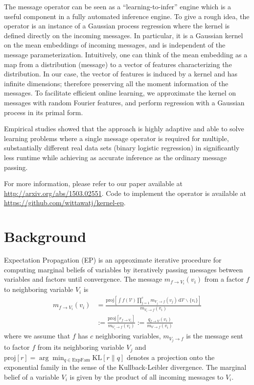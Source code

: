 \documentclass[a4paper,10pt]{article}
\begin{document}
The message operator can be seen as a ``learning-to-infer'' engine
which is a useful component in a fully automated inference engine. To give a
rough idea, the operator is an instance of a Gaussian process regression where 
the kernel is defined directly on the incoming messages. In particular, it is a
Gaussian kernel on the mean embeddings of incoming messages, and is independent
of the message parameterization. Intuitively, one can think of the mean
embedding as a map from a distribution (message) to a vector of features
characterizing the distribution. In our case, the vector of features is
induced by a kernel and has infinite dimensions; therefore preserving all the moment
information of the messages. To facilitate efficient online learning, we approximate the kernel 
on messages with random Fourier features, and perform regression with a
Gaussian process in its primal form.

Empirical studies showed that the approach is highly adaptive and able to solve
learning problems where a single message operator is required for multiple,
substantially different real data sets (binary logistic regression) in
significantly less runtime while achieving as accurate inference as the
ordinary message passing. 

For more information, please refer to our paper available at
\url{http://arxiv.org/abs/1503.02551}. Code to implement the operator is available 
at \url{https://github.com/wittawatj/kernel-ep}.

\hrulefill{}

\section{Background}

Expectation Propagation (EP) is an approximate iterative procedure for
computing marginal beliefs of variables by iteratively passing messages between
variables and factors until convergence.  The message $m_{f \rightarrow V_i}(v_i)$ 
from a factor $f$ to neighboring variable $V_i$ is 
\begin{align*}
    m_{f \rightarrow V_i}(v_i) &= \frac{
        \mathrm{proj}\left[ 
            \int f(\mathcal{V}) \prod_{j=1}^c m_{V_j \rightarrow f}(v_j) 
            \, \mathrm{d}\mathcal{V} \backslash \{v_i \}
        \right]
    }{m_{V_i \rightarrow f}(v_i) }  \\
    &:=
    \frac{ \mathrm{proj}[r_{f \rightarrow V_i}]}{m_{V_i \rightarrow f}(v_i)} 
    :=
    \frac{q_{f \rightarrow V}(v_i)}{m_{V \rightarrow f}(v_i)} 
\end{align*}
where we assume that $f$ has $c$ neighboring variables, $m_{V_j \rightarrow f}$
is the message sent to factor $f$ from its neighboring 
variable $V_j$ and $\mathrm{proj}[r] = \arg\min_{q \in \mathrm{ExpFam}} \mathrm{KL}[r \| q]$ denotes a projection onto the
exponential family in the sense of the Kullback-Leibler divergence.
The marginal belief of a variable $V_i$ is given by the product of all incoming messages 
to $V_i$. 
\end{document}
